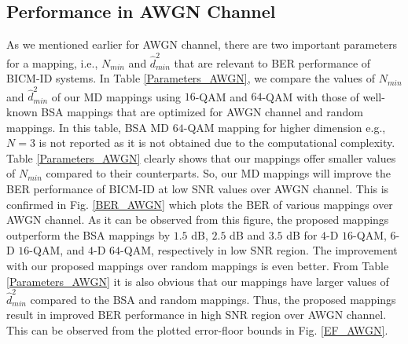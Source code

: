 \documentclass[12pt, draftclsnofoot, onecolumn]{IEEEtran}
\begin{document}
\subsection{Performance in AWGN Channel}
As we mentioned earlier for AWGN channel, there are two important parameters for  a mapping,   i.e., $N_{min}$ and  $\hat{d}_{min}^{2}$ that are relevant  to  BER performance of BICM-ID systems.  In Table \ref{Parameters_AWGN}, we compare the values of $N_{min}$ and  $\hat{d}_{min}^{2}$ of our  MD mappings using $16$-QAM and $64$-QAM  with those of   well-known  BSA mappings   \color{black}  that are optimized for AWGN channel and  random mappings.    In this table,  BSA MD $64$-QAM   mapping  for higher dimension e.g., $N=3$ is not reported as it is not  obtained due to the computational complexity.   Table \ref{Parameters_AWGN} clearly shows that our mappings offer smaller values of $N_{min}$ compared to    their counterparts\color{black}.   So, our MD mappings  will improve the  BER performance of BICM-ID at low SNR  values over AWGN channel. This is confirmed in  Fig. \ref{BER_AWGN} which plots the BER of   various mappings \color{black} over  AWGN channel. As it can be observed from this figure, the proposed mappings outperform the BSA mappings by $1.5$ dB, $2.5$ dB and $3.5$ dB for $4$-D $16$-QAM, $6$-D $16$-QAM, and $4$-D $64$-QAM, respectively in low SNR region.   The improvement  with our proposed  mappings over  random mappings is even better.  \color{black} From Table \ref{Parameters_AWGN} it is also obvious that our mappings have  larger values of $\hat{d}_{min}^{2}$ compared to the BSA   and random mappings. Thus, the proposed \color{black} mappings   result  in  improved BER performance in high SNR region over AWGN channel.  This can be observed from the plotted   error-floor bounds    in Fig. \ref{EF_AWGN}.
\end{document}
